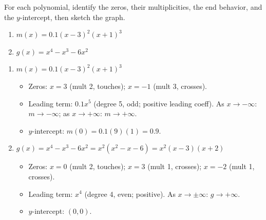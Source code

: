 \documentclass{ximera}
\begin{document}
\begin{problem}
For each polynomial, identify the zeros, their multiplicities, the end behavior, and the $y$-intercept, then sketch the graph.
\begin{enumerate}
  \item[(a)] $m(x) = 0.1(x-3)^2(x+1)^3$
  \medskip
  \item[(b)] $g(x) = x^4 - x^3 - 6x^2$
\end{enumerate}

\begin{solution}
\begin{enumerate}
  \item[(a)] $m(x) = 0.1(x-3)^2(x+1)^3$
  \begin{itemize}
    \item Zeros: $x=3$ (mult 2, touches); $x=-1$ (mult 3, crosses).
    \item Leading term: $0.1x^5$ (degree 5, odd; positive leading coeff). As $x\to-\infty$: $m\to-\infty$; as $x\to+\infty$: $m\to+\infty$.
    \item $y$-intercept: $m(0) = 0.1(9)(1) = 0.9$.
  \end{itemize}

\begin{center}
\end{center}

  \item[(b)] $g(x) = x^4-x^3-6x^2 = x^2(x^2-x-6) = x^2(x-3)(x+2)$
  \begin{itemize}
    \item Zeros: $x=0$ (mult 2, touches); $x=3$ (mult 1, crosses); $x=-2$ (mult 1, crosses).
    \item Leading term: $x^4$ (degree 4, even; positive). As $x\to\pm\infty$: $g\to+\infty$.
    \item $y$-intercept: $(0,0)$.
  \end{itemize}


\end{enumerate}
\end{solution}
\end{problem}
\end{document}
